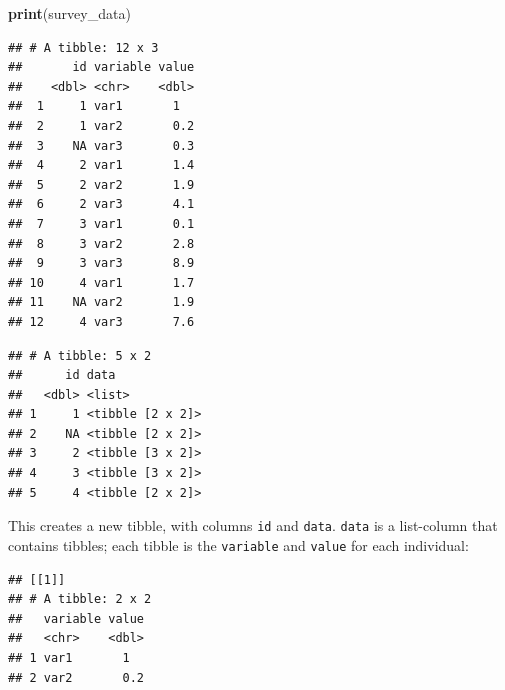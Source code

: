 \documentclass[]{gitbook}
\newenvironment{Shaded}{\begin{snugshade}}{\end{snugshade}}
\newcommand{\KeywordTok}[1]{\textcolor[rgb]{0.13,0.29,0.53}{\textbf{#1}}}
\newcommand{\NormalTok}[1]{#1}
\newcommand{\OperatorTok}[1]{\textcolor[rgb]{0.81,0.36,0.00}{\textbf{#1}}}
\newcommand{\StringTok}[1]{\textcolor[rgb]{0.31,0.60,0.02}{#1}}
\begin{document}
\begin{Shaded}
\begin{Highlighting}[]
\KeywordTok{print}\NormalTok{(survey_data)}
\end{Highlighting}
\end{Shaded}

\begin{verbatim}
## # A tibble: 12 x 3
##       id variable value
##    <dbl> <chr>    <dbl>
##  1     1 var1       1  
##  2     1 var2       0.2
##  3    NA var3       0.3
##  4     2 var1       1.4
##  5     2 var2       1.9
##  6     2 var3       4.1
##  7     3 var1       0.1
##  8     3 var2       2.8
##  9     3 var3       8.9
## 10     4 var1       1.7
## 11    NA var2       1.9
## 12     4 var3       7.6
\end{verbatim}

\begin{Shaded}
\end{Shaded}

\begin{verbatim}
## # A tibble: 5 x 2
##      id data            
##   <dbl> <list>          
## 1     1 <tibble [2 x 2]>
## 2    NA <tibble [2 x 2]>
## 3     2 <tibble [3 x 2]>
## 4     3 <tibble [3 x 2]>
## 5     4 <tibble [2 x 2]>
\end{verbatim}

This creates a new tibble, with columns \texttt{id} and \texttt{data}. \texttt{data} is a list-column that contains
tibbles; each tibble is the \texttt{variable} and \texttt{value} for each individual:

\begin{Shaded}
\end{Shaded}

\begin{verbatim}
## [[1]]
## # A tibble: 2 x 2
##   variable value
##   <chr>    <dbl>
## 1 var1       1  
## 2 var2       0.2
\end{verbatim}
\end{document}
